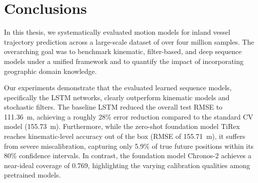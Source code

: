 \chapter{Conclusions}%
\label{chap:conclusion}
\acresetall %

In this thesis, we systematically evaluated motion models for inland vessel trajectory prediction across a large-scale dataset of over four million samples.
The overarching goal was to benchmark kinematic, filter-based, and deep sequence models under a unified framework and to quantify the impact of incorporating geographic domain knowledge.

Our experiments demonstrate that the evaluated learned sequence models, specifically the \ac{LSTM} networks, clearly outperform kinematic models and stochastic filters.
The baseline \ac{LSTM} reduced the overall test \ac{RMSE} to 111.36~m, achieving a roughly 28\% error reduction compared to the standard \ac{CV} model (155.73~m). %
Furthermore, while the zero-shot foundation model TiRex reaches kinematic-level accuracy out of the box (RMSE of 155.71~m), it suffers from severe miscalibration, capturing only 5.9\% of true future positions within its 80\% confidence intervals.
In contrast, the foundation model Chronos-2 achieves a near-ideal coverage of 0.769, highlighting the varying calibration qualities among pretrained models.


